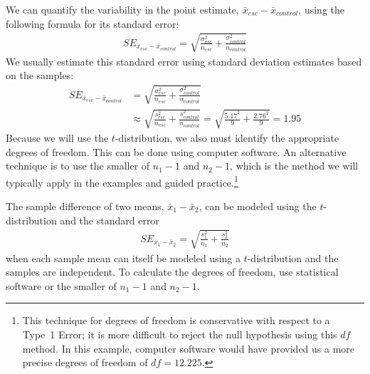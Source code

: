 {We can quantify the variability in the point estimate, $\bar{x}_{esc} - \bar{x}_{control}$, using the following formula for its standard error:
\begin{eqnarray*}
SE_{\bar{x}_{esc} - \bar{x}_{control}} = \sqrt{\frac{\sigma_{esc}^2}{n_{esc}} + \frac{\sigma_{control}^2}{n_{control}}}
\end{eqnarray*}
We usually estimate this standard error using standard deviation estimates  based on the samples:
\begin{align*}
SE_{\bar{x}_{esc} - \bar{x}_{control}}
	&= \sqrt{\frac{\sigma_{esc}^2}{n_{esc}} + \frac{\sigma_{control}^2}{n_{control}}} \\
	&\approx \sqrt{\frac{s_{esc}^2}{n_{esc}} + \frac{s_{control}^2}{n_{control}}}
	= \sqrt{\frac{5.17^2}{9} + \frac{2.76^2}{9}} = 1.95
\end{align*}
Because we will use the $t$-distribution, we also must identify the appropriate degrees of freedom. This can be done using computer software. An alternative technique is to use the smaller of $n_1 - 1$ and $n_2 - 1$, which is the method we will typically apply in the examples and guided practice.\footnote{This technique for degrees of freedom is conservative with respect to a Type~1 Error; it is more difficult to reject the null hypothesis using this $df$ method. In this example, computer software would have provided us a more precise degrees of freedom of $df = 12.225$.}

\begin{termBox}{
The sample difference of two means, $\bar{x}_1 - \bar{x}_2$, can be modeled using the $t$-distribution and the standard error
\begin{eqnarray}
\textstyle
SE_{\bar{x}_{1} - \bar{x}_{2}} = \sqrt{\frac{s_1^2}{n_1} + \frac{s_2^2}{n_2}}
\label{seOfDifferenceInMeans}
\end{eqnarray}
when each sample mean can itself be modeled using a $t$-distribution and the samples are independent. To calculate the degrees of freedom, use statistical software or the smaller of $n_1 - 1$ and $n_2 - 1$.}
\end{termBox}\textC{\vspace{-10mm}}

}

